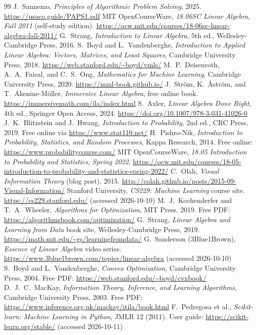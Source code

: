 \begin{thebibliography}{99}
 J.~Sannemo, \emph{Principles of Algorithmic Problem Solving}, 2025. \url{https://usaco.guide/PAPS1.pdf}
 MIT OpenCourseWare, \emph{18.06SC Linear Algebra, Fall 2011} (self-study edition). \url{https://ocw.mit.edu/courses/18-06sc-linear-algebra-fall-2011/}
 G.~Strang, \emph{Introduction to Linear Algebra}, 5th ed., Wellesley-Cambridge Press, 2016.
 S.~Boyd and L.~Vandenberghe, \emph{Introduction to Applied Linear Algebra: Vectors, Matrices, and Least Squares}, Cambridge University Press, 2018. \url{https://web.stanford.edu/~boyd/vmls/}
 M.~P.~Deisenroth, A.~A.~Faisal, and C.~S.~Ong, \emph{Mathematics for Machine Learning}, Cambridge University Press, 2020. \url{https://mml-book.github.io/}
 J.~Str\"om, K.~\AA str\"om, and T.~Akenine-M\"oller, \emph{Immersive Linear Algebra}, free online book. \url{https://immersivemath.com/ila/index.html}
 S.~Axler, \emph{Linear Algebra Done Right}, 4th ed., Springer Open Access, 2024. \url{https://doi.org/10.1007/978-3-031-41026-0}
 J.~K.~Blitzstein and J.~Hwang, \emph{Introduction to Probability}, 2nd ed., CRC Press, 2019. Free online via \url{https://www.stat110.net/}
 H.~Pishro-Nik, \emph{Introduction to Probability, Statistics, and Random Processes}, Kappa Research, 2014. Free online: \url{https://www.probabilitycourse.com/}
 MIT OpenCourseWare, \emph{18.05 Introduction to Probability and Statistics, Spring 2022}. \url{https://ocw.mit.edu/courses/18-05-introduction-to-probability-and-statistics-spring-2022/}
 C.~Olah, \emph{Visual Information Theory} (blog post), 2015. \url{http://colah.github.io/posts/2015-09-Visual-Information/}
 Stanford University, \emph{CS229: Machine Learning} course site. \url{https://cs229.stanford.edu/} (accessed 2026-10-10)
 M.~J.~Kochenderfer and T.~A.~Wheeler, \emph{Algorithms for Optimization}, MIT Press, 2019. Free PDF: \url{https://algorithmsbook.com/optimization/}
 G.~Strang, \emph{Linear Algebra and Learning from Data} book site, Wellesley-Cambridge Press, 2019. \url{https://math.mit.edu/~gs/learningfromdata/}
 G.~Sanderson (3Blue1Brown), \emph{Essence of Linear Algebra} video series. \url{https://www.3blue1brown.com/topics/linear-algebra} (accessed 2026-10-10)
 S.~Boyd and L.~Vandenberghe, \emph{Convex Optimization}, Cambridge University Press, 2004. Free PDF: \url{https://web.stanford.edu/~boyd/cvxbook/}
 D.~J.~C.~MacKay, \emph{Information Theory, Inference, and Learning Algorithms}, Cambridge University Press, 2003. Free PDF: \url{https://www.inference.org.uk/mackay/itila/book.html}
 F.~Pedregosa et al., \emph{Scikit-learn: Machine
  Learning in Python}, JMLR 12 (2011). User guide:
  \url{https://scikit-learn.org/stable/} (accessed 2026-10-11)
\end{thebibliography}

